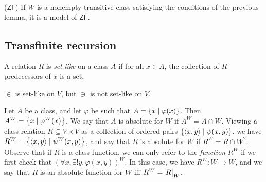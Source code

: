 \begin{corollary}
    (\( \mathsf{ZF} \))
    If \( W \) is a nonempty transitive class satisfying the conditions of the previous lemma, it is a model of \( \mathsf{ZF} \).
\end{corollary}

\subsection{Transfinite recursion}
\begin{definition}
    A relation \( R \) is \emph{set-like} on a class \( A \) if for all \( x \in A \), the collection of \( R \)-predecessors of \( x \) is a set.
\end{definition}
\begin{example}
    \( \in \) is set-like on \( V \), but \( \ni \) is not set-like on \( V \).
\end{example}
Let \( A \) be a class, and let \( \varphi \) be such that \( A = \qty{x \mid \varphi(x)} \).
Then \( A^W = \qty{x \mid \varphi^W(x)} \).
We say that \( A \) is absolute for \( W \) if \( A^W = A \cap W \).
Viewing a class relation \( R \subseteq V \times V \) as a collection of ordered pairs \( \qty{\langle x, y \rangle \mid \psi(x, y)} \), we have \( R^W = \qty{\langle x, y \rangle \mid \psi^W(x, y)} \), and say that \( R \) is absolute for \( W \) if \( R^W = R \cap W^2 \).
Observe that if \( R \) is a class function, we can only refer to the \emph{function} \( R^W \) if we first check that \( (\forall x.\, \exists! y.\, \varphi(x, y))^W \).
In this case, we have \( R^W : W \to W \), and we say that \( R \) is an absolute function for \( W \) iff \( R^W = \eval{R}_W \).

